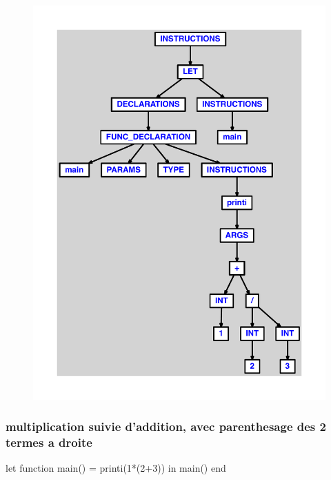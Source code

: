 \documentclass{article}
\begin{document}
\begin{figure}[H]\centering\includegraphics[max width=\textwidth]{ast/ast_90.pdf}\end{figure}\subsubsection{multiplication suivie d'addition, avec parenthesage des 2 termes a droite}
\begin{verbatimtab}
let function main() = printi(1*(2+3)) in main() end
\end{verbatimtab}
\end{document}
